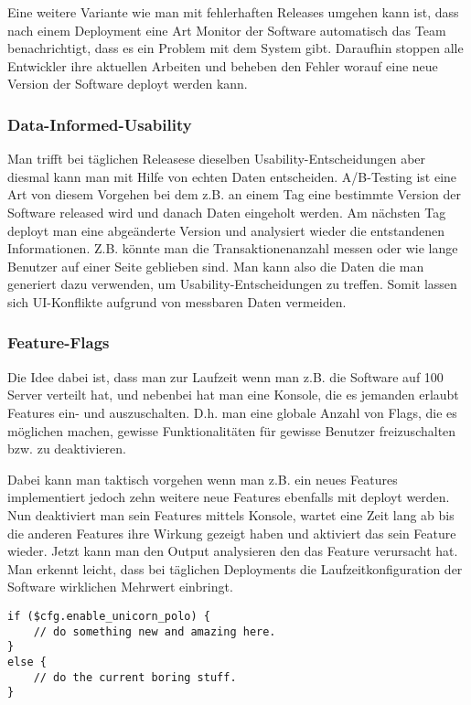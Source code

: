 Eine weitere Variante wie man mit fehlerhaften Releases umgehen kann ist, dass
nach einem Deployment eine Art Monitor der Software automatisch das Team
benachrichtigt, dass es ein Problem mit dem System gibt. Daraufhin stoppen
alle Entwickler ihre aktuellen Arbeiten und beheben den Fehler worauf eine
neue Version der Software deployt werden kann.

\subsubsection{Data-Informed-Usability}
Man trifft bei täglichen Releasese dieselben Usability-Entscheidungen aber
diesmal kann man mit Hilfe von echten Daten entscheiden. A/B-Testing ist eine
Art von diesem Vorgehen bei dem z.B. an einem Tag eine bestimmte Version der
Software released wird und danach Daten eingeholt werden. Am nächsten Tag
deployt man eine abgeänderte Version und analysiert wieder die entstandenen
Informationen. Z.B. könnte man die Transaktionenanzahl messen oder wie lange
Benutzer auf einer Seite geblieben sind. Man kann also die Daten die man
generiert dazu verwenden, um Usability-Entscheidungen zu treffen. Somit lassen
sich UI-Konflikte  aufgrund von messbaren Daten vermeiden.

\subsubsection{Feature-Flags}
\label{minisec:featureflags}
Die Idee dabei ist, dass man zur Laufzeit wenn man z.B. die Software auf 100
Server verteilt hat, und nebenbei hat man eine Konsole, die es jemanden
erlaubt Features ein- und auszuschalten. D.h. man eine globale Anzahl von
Flags, die es möglichen machen, gewisse Funktionalitäten für gewisse Benutzer
freizuschalten bzw. zu deaktivieren.

Dabei kann man taktisch vorgehen wenn man z.B. ein neues Features
implementiert jedoch zehn weitere neue Features ebenfalls mit deployt werden.
Nun deaktiviert man sein Features mittels Konsole, wartet eine Zeit lang ab
bis die anderen Features ihre Wirkung gezeigt haben und aktiviert das sein
Feature wieder. Jetzt kann man den Output analysieren den das Feature
verursacht hat. Man erkennt leicht, dass bei täglichen Deployments die
Laufzeitkonfiguration der Software wirklichen Mehrwert einbringt.

\begin{lstlisting}[float=h!tb,caption=Beispiel eines Feature Flags bei Flickr \cite{flickr09}, label=fflagcode]
if ($cfg.enable_unicorn_polo) {
    // do something new and amazing here.
}
else {
    // do the current boring stuff.
}
\end{lstlisting}


